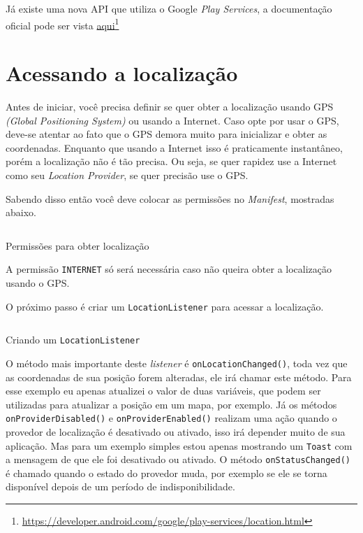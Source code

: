 \documentclass[a4paper,12pt,brazil,oneside]{book}
\begin{document}
\begin{singlespace}
		Já existe uma nova API que utiliza o Google \emph{Play Services}, a documentação oficial pode ser vista \href{https://developer.android.com/google/play-services/location.html}{aqui}\footnote{\href{https://developer.android.com/google/play-services/location.html}{https://developer.android.com/google/play-services/location.html}}

		\section{Acessando a localização}
	
		Antes de iniciar, você precisa definir se quer obter a localização usando GPS \emph{(Global Positioning System)} ou usando a Internet. Caso opte por usar o GPS, deve-se atentar ao fato que o GPS demora muito para inicializar e obter as coordenadas. Enquanto que usando a Internet isso é praticamente instantâneo, porém a localização não é tão precisa. Ou seja, se quer rapidez use a Internet como seu \emph{Location Provider}, se quer precisão use o GPS.

		Sabendo disso então você deve colocar as permissões no \emph{Manifest}, mostradas abaixo.

		\begin{listing}[H]
		\inputminted[linenos=true,fontsize=\small,frame=lines, framesep=2mm, tabsize=2,numbersep=5pt]{xml}{src/api/maps/perm1.xml}
		\caption{Permissões para obter localização}
		\label{code:locationperm}
		\end{listing} 		

		A permissão \texttt{INTERNET} só será necessária caso não queira obter a localização usando o GPS.

		O próximo passo é criar um \texttt{LocationListener} para acessar a localização.

		\begin{listing}[H]
		\inputminted[linenos=true,fontsize=\small,frame=lines, framesep=2mm, tabsize=2,numbersep=5pt]{java}{src/api/maps/listener.java}
		\caption{Criando um \texttt{LocationListener}}
		\label{code:locationlistener}
		\end{listing} 	

		O método mais importante deste \emph{listener} é \texttt{onLocationChanged()}, toda vez que as coordenadas de sua posição forem alteradas, ele irá chamar este método. Para esse exemplo eu apenas atualizei o valor de duas variáveis, que podem ser utilizadas para atualizar a posição em um mapa, por exemplo. Já os métodos \texttt{onProviderDisabled()} e \texttt{onProviderEnabled()} realizam uma ação quando o provedor de localização é desativado ou ativado, isso irá depender muito de sua aplicação. Mas para um exemplo simples estou apenas mostrando um \texttt{Toast} com a mensagem de que ele foi desativado ou ativado. O método \texttt{onStatusChanged()} é chamado quando o estado do provedor muda, por exemplo se ele se torna disponível depois de um período de indisponibilidade.


\end{singlespace}
\end{document}
